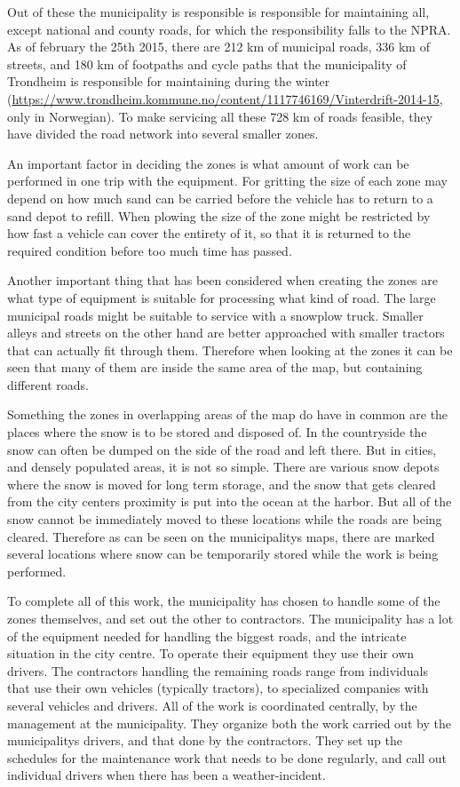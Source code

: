 Out of these the municipality is responsible is responsible for maintaining all, except national and county roads, for which the responsibility falls to the NPRA. As of february the 25th 2015, there are 212 km of municipal roads, 336 km of streets, and 180 km of footpaths and cycle paths that the municipality of Trondheim is responsible for maintaining during the winter (\url{https://www.trondheim.kommune.no/content/1117746169/Vinterdrift-2014-15}, only in Norwegian). To make servicing all these 728 km of roads feasible, they have divided the road network into several smaller zones.

An important factor in deciding the zones is what amount of work can be performed in one trip with the equipment. For gritting the size of each zone may depend on how much sand can be carried before the vehicle has to return to a sand depot to refill. When plowing the size of the zone might be restricted by how fast a vehicle can cover the entirety of it, so that it is returned to the required condition before too much time has passed.

Another important thing that has been considered when creating the zones are what type of equipment is suitable for processing what kind of road. The large municipal roads might be suitable to service with a snowplow truck. Smaller alleys and streets on the other hand are better approached with smaller tractors that can actually fit through them. Therefore when looking at the zones it can be seen that many of them are inside the same area of the map, but containing different roads.

Something the zones in overlapping areas of the map do have in common are the places where the snow is to be stored and disposed of. In the countryside the snow can often be dumped on the side of the road and left there. But in cities, and densely populated areas, it is not so simple. There are various snow depots where the snow is moved for long term storage, and the snow that gets cleared from the city centers proximity is put into the ocean at the harbor. But all of the snow cannot be immediately moved to these locations while the roads are being cleared. Therefore as can be seen on the municipalitys maps, there are marked several locations where snow can be temporarily stored while the work is being performed.

To complete all of this work, the municipality has chosen to handle some of the zones themselves, and set out the other to contractors. The municipality has a lot of the equipment needed for handling the biggest roads, and the intricate situation in the city centre. To operate their equipment they use their own drivers. The contractors handling the remaining roads range from individuals that use their own vehicles (typically tractors), to specialized companies with several vehicles and drivers. All of the work is coordinated centrally, by the management at the municipality. They organize both the work carried out by the municipalitys drivers, and that done by the contractors. They set up the schedules for the maintenance work that needs to be done regularly, and call out individual drivers when there has been a weather-incident.

